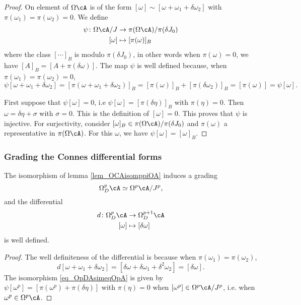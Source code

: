 \begin{proof}
On element of $\Omega\cA$ is of the form $[\omega]\sim [\omega+\omega_1+\delta\omega_2]$ with $\pi(\omega_1)=\pi(\omega_2)=0$. We define
\begin{equation}
\begin{aligned}
 \psi\colon \Omega\cA/J&\to \pi(\Omega\cA)/\pi(\delta J_0) \\ 
[\omega]&\mapsto [\pi(\omega)]_B
\end{aligned}
\end{equation}
where the class $[\cdots]_B$ is modulo $\pi(\delta J_0)$, in other words when $\pi(\omega)=0$, we have $[A]_B=[A+\pi(\delta\omega)]$.  The map $\psi$ is well defined because, when $\pi(\omega_1)=\pi(\omega_2)=0$,
\[ 
\psi[\omega+\omega_1+\delta\omega_2]=[\pi(\omega+\omega_1+\delta\omega_2)]_B
		=[\pi(\omega)]_B+[\pi(\delta\omega_2)]_B
		=[\pi(\omega)]
		=\psi[\omega].
\]

First suppose that $\psi[\omega]=0$, i.e $\psi[\omega]=[\pi(\delta\eta)]_B$ with $\pi(\eta)=0$. Then $\omega=\delta\eta+\sigma$ with $\sigma=0$. This is the definition of $[\omega]=0$. This proves that $\psi$ is injective. For surjectivity, consider $[\omega]_B\in\pi(\Omega\cA)/\pi(\delta J_0)$ and $\pi(\omega)$ a representative in $\pi(\Omega\cA)$. For this $\omega$, we have $\psi[\omega]=[\omega]_B$.
\end{proof}

\subsubsection{Grading the Connes differential forms}

\begin{lemma}			\label{LemOmpmdDp}
The isomorphism of lemma \ref{lem_OCAisomppiOA} induces a grading 
\begin{equation} \label{eq_OpDAsimeqOpA}
  \Omega^p_D\cA\simeq \Omega^p\cA/J^p,
\end{equation}
and the differential
\begin{equation}
\begin{aligned}
 d\colon \Omega^p_D\cA&\to \Omega^{p+1}_D\cA \\ 
[\omega]&\mapsto [\delta\omega] 
\end{aligned}
\end{equation}
is well defined.
  \label{lem_isomgraODA}
\end{lemma}

\begin{proof}
 The well definiteness of the differential is because when $\pi(\omega_1)=\pi(\omega_2)$,
\[ 
d[\omega+\omega_1+\delta\omega_2]=[\delta\omega+\delta\omega_1+\delta^2\omega_2]
		=[\delta\omega].
\]
The isomorphism \eqref{eq_OpDAsimeqOpA} is given by   $\psi[\omega^p]=[\pi(\omega^p)+\pi(\delta\eta)]$ with $\pi(\eta)=0$ when $[\omega^p]\in\Omega^p\cA/J^p$, i.e. when $\omega^p\in\Omega^p\cA$.
\end{proof}

